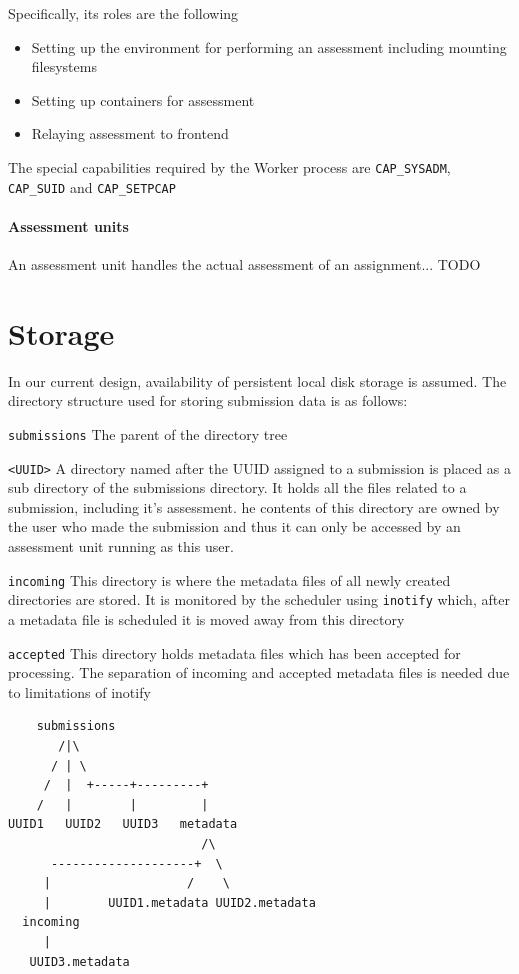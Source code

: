 Specifically, its roles are the following
\begin{itemize}
\item Setting up the environment for performing an assessment
  including mounting filesystems
\item Setting up containers for assessment
\item Relaying assessment to frontend
\end{itemize}

The special capabilities required by the Worker process are
\texttt{CAP\_SYSADM}, \texttt{CAP\_SUID} and \texttt{CAP\_SETPCAP}

\paragraph{Assessment units}
An assessment unit handles the actual assessment of an assignment... TODO

\section{Storage}
In our current design, availability of persistent local disk storage
is assumed. The directory structure used for storing submission data
is as follows:

\begin{description}
\item{\texttt{submissions}} The parent of the directory tree
\item{\texttt{<UUID>}} A directory named after the UUID assigned to
  a submission is placed as a sub directory of the submissions
  directory. It holds all the files related to a submission, including
  it's assessment.  he contents of this directory are owned by the user
  who made the submission and thus it can only be accessed by an
  assessment unit running as this user.
\item{\texttt{incoming}} This directory is where the metadata files of
  all newly created directories are stored. It is monitored by the
  scheduler using \texttt{inotify} which, after a metadata file is
  scheduled it is moved away from this directory
\item{\texttt{accepted}} This directory holds metadata files which has
  been accepted for processing. The separation of incoming and
  accepted metadata files is needed due to limitations of inotify 
\end{description}

\begin{verbatim}
    submissions
       /|\
      / | \
     /  |  +-----+---------+
    /   |        |         |
UUID1   UUID2   UUID3   metadata
                           /\
      --------------------+  \
     |                   /    \
     |        UUID1.metadata UUID2.metadata
  incoming
     |
   UUID3.metadata

\end{verbatim}


